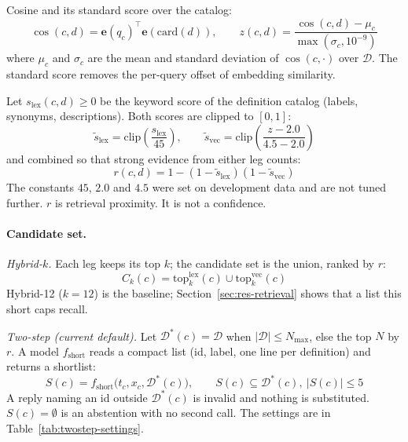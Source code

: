 \documentclass[11pt,a4paper]{article}
\begin{document}
Cosine and its standard score over the catalog:
\begin{equation}
\cos(c,d) = \mathbf{e}(q_c)^\top \mathbf{e}(\mathrm{card}(d)), \qquad
z(c,d) = \frac{\cos(c,d) - \mu_c}{\max(\sigma_c, 10^{-9})}
\end{equation}
where $\mu_c$ and $\sigma_c$ are the mean and standard deviation of $\cos(c,\cdot)$ over $\mathcal{D}$. The standard score removes the per-query offset of embedding similarity.

Let $s_{\mathrm{lex}}(c,d)\ge 0$ be the keyword score of the definition catalog (labels, synonyms, descriptions). Both scores are clipped to $[0,1]$:
\begin{equation}
\tilde{s}_{\mathrm{lex}} = \mathrm{clip}\!\left(\frac{s_{\mathrm{lex}}}{45}\right), \qquad
\tilde{s}_{\mathrm{vec}} = \mathrm{clip}\!\left(\frac{z - 2.0}{4.5 - 2.0}\right)
\end{equation}
and combined so that strong evidence from either leg counts:
\begin{equation}
r(c,d) = 1 - (1-\tilde{s}_{\mathrm{lex}})(1-\tilde{s}_{\mathrm{vec}})
\end{equation}
The constants $45$, $2.0$ and $4.5$ were set on development data and are not tuned further. $r$ is retrieval proximity. It is not a confidence.

\paragraph{Candidate set.}
\textit{Hybrid-$k$.} Each leg keeps its top $k$; the candidate set is the union, ranked by $r$:
\begin{equation}
C_k(c) = \mathrm{top}_k^{\mathrm{lex}}(c) \cup \mathrm{top}_k^{\mathrm{vec}}(c)
\end{equation}
Hybrid-12 ($k=12$) is the baseline; Section~\ref{sec:res-retrieval} shows that a list this short caps recall.

\textit{Two-step (current default).} Let $\mathcal{D}^{\ast}(c) = \mathcal{D}$ when $|\mathcal{D}| \le N_{\max}$, else the top $N$ by $r$. A model $f_{\mathrm{short}}$ reads a compact list (id, label, one line per definition) and returns a shortlist:
\begin{equation}
S(c) = f_{\mathrm{short}}\big(t_c, x_c, \mathcal{D}^{\ast}(c)\big), \qquad S(c) \subseteq \mathcal{D}^{\ast}(c),\ |S(c)| \le 5
\end{equation}
A reply naming an id outside $\mathcal{D}^{\ast}(c)$ is invalid and nothing is substituted. $S(c)=\emptyset$ is an abstention with no second call. The settings are in Table~\ref{tab:twostep-settings}.
\end{document}
